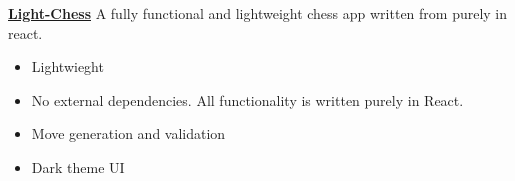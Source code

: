 \begin{experience}[last]{\href{https://light-chess.netlify.app/}{\textbf{Light-Chess}}}{
}
A fully functional and lightweight chess app written from purely in react.

\begin{itemize}
 	\item Lightwieght
 	\item No external dependencies. All functionality is written purely in React.
 	\item Move generation and validation
 	\item Dark theme UI
\end{itemize}

\end{experience}


